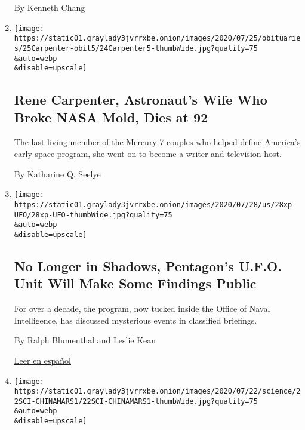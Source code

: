 \begin{enumerate}
  By Kenneth Chang
\item
  \href{/2020/07/24/us/rene-carpenter-dead.html}{}

  \texttt{[image: https://static01.graylady3jvrrxbe.onion/images/2020/07/25/obituaries/25Carpenter-obit5/24Carpenter5-thumbWide.jpg?quality=75\\\&auto=webp\\\&disable=upscale]}

  \hypertarget{rene-carpenter-astronauts-wife-who-broke-nasa-mold-dies-at-92}{%
  \subsection{Rene Carpenter, Astronaut's Wife Who Broke NASA Mold, Dies
  at
  92}\label{rene-carpenter-astronauts-wife-who-broke-nasa-mold-dies-at-92}}

  The last living member of the Mercury 7 couples who helped define
  America's early space program, she went on to become a writer and
  television host.

  By Katharine Q. Seelye
\item
  \href{/2020/07/23/us/politics/pentagon-ufo-harry-reid-navy.html}{}

  \texttt{[image: https://static01.graylady3jvrrxbe.onion/images/2020/07/28/us/28xp-UFO/28xp-UFO-thumbWide.jpg?quality=75\\\&auto=webp\\\&disable=upscale]}

  \hypertarget{no-longer-in-shadows-pentagons-ufo-unit-will-make-some-findings-public}{%
  \subsection{No Longer in Shadows, Pentagon's U.F.O. Unit Will Make
  Some Findings
  Public}\label{no-longer-in-shadows-pentagons-ufo-unit-will-make-some-findings-public}}

  For over a decade, the program, now tucked inside the Office of Naval
  Intelligence, has discussed mysterious events in classified briefings.

  By Ralph Blumenthal and Leslie Kean

  \href{https://www.nytimes3xbfgragh.onion/es/2020/07/24/espanol/ovnis-pentagono.html}{Leer
  en español}
\item
  \href{/2020/07/22/science/china-mars-mission.html}{}

  \texttt{[image: https://static01.graylady3jvrrxbe.onion/images/2020/07/22/science/22SCI-CHINAMARS1/22SCI-CHINAMARS1-thumbWide.jpg?quality=75\\\&auto=webp\\\&disable=upscale]}

  \hypertarget{china-will-answer-heavenly-question-can-it-land-on-mars}{%
}
\end{enumerate}
